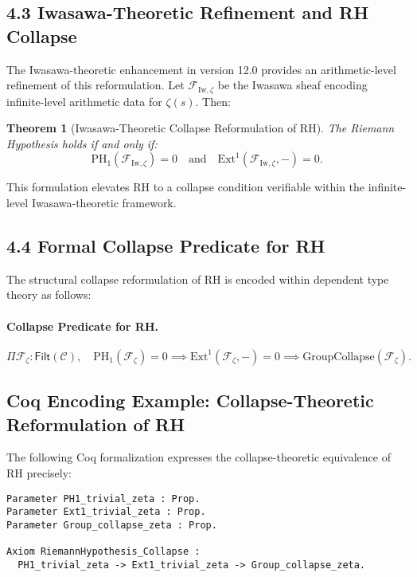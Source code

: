 \documentclass[11pt]{article}
\newtheorem{theorem}{Theorem}[section]
\begin{document}
\subsection*{4.3 Iwasawa-Theoretic Refinement and RH Collapse}

The Iwasawa-theoretic enhancement in version 12.0 provides an arithmetic-level refinement of this reformulation. Let $\mathcal{F}_{\mathrm{Iw}, \zeta}$ be the Iwasawa sheaf encoding infinite-level arithmetic data for $\zeta(s)$. Then:

\begin{theorem}[Iwasawa-Theoretic Collapse Reformulation of RH]
The Riemann Hypothesis holds if and only if:
\[
\mathrm{PH}_1(\mathcal{F}_{\mathrm{Iw}, \zeta}) = 0 \quad \text{and} \quad \mathrm{Ext}^1(\mathcal{F}_{\mathrm{Iw}, \zeta}, -) = 0.
\]
\end{theorem}

This formulation elevates RH to a collapse condition verifiable within the infinite-level Iwasawa-theoretic framework.

\subsection*{4.4 Formal Collapse Predicate for RH}

The structural collapse reformulation of RH is encoded within dependent type theory as follows:

\paragraph{Collapse Predicate for RH.}
\[
\Pi \mathcal{F}_{\zeta} : \mathsf{Filt}(\mathcal{C}), \quad \mathrm{PH}_1(\mathcal{F}_{\zeta}) = 0 \implies \mathrm{Ext}^1(\mathcal{F}_{\zeta}, -) = 0 \implies \mathrm{GroupCollapse}(\mathcal{F}_{\zeta}).
\]

\subsection*{Coq Encoding Example: Collapse-Theoretic Reformulation of RH}

The following Coq formalization expresses the collapse-theoretic equivalence of RH precisely:

\begin{lstlisting}[language=Coq, caption=Collapse-Theoretic Reformulation of the Riemann Hypothesis, captionpos=b]
Parameter PH1_trivial_zeta : Prop.
Parameter Ext1_trivial_zeta : Prop.
Parameter Group_collapse_zeta : Prop.

Axiom RiemannHypothesis_Collapse :
  PH1_trivial_zeta -> Ext1_trivial_zeta -> Group_collapse_zeta.
\end{lstlisting}
\end{document}
